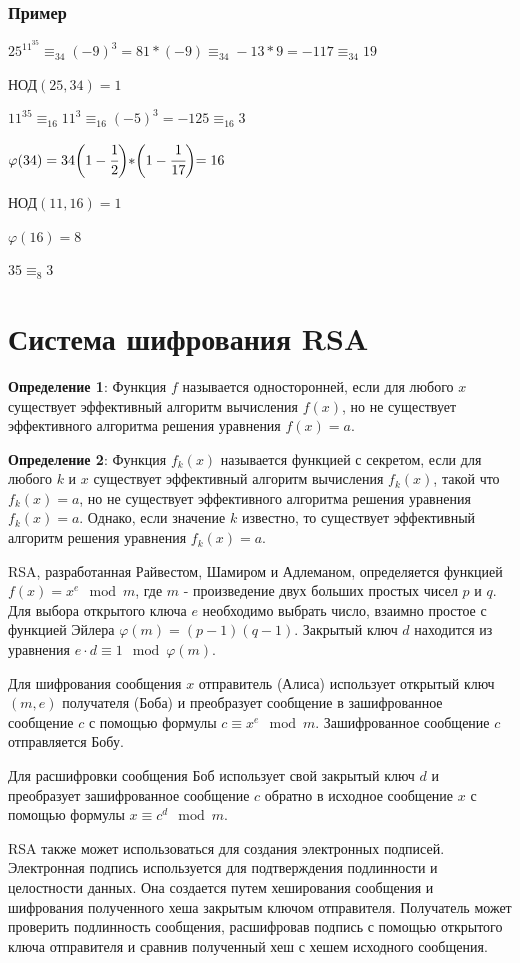 \documentclass[12pt]{article}
\begin{document}
    \subsubsection{Пример}
    $25^{11^{35}}\equiv_{34}(-9)^{3}=81*(-9)\equiv_{34}-13*9=-117\equiv_{34}19$
    \par НОД$(25,34)=1$
    \par $11^{35}\equiv_{16}11^{3}\equiv_{16}(-5)^{3}=-125\equiv_{16}3$
    \par $\varphi(34)=34\biggl(1-\cfrac{1}{2}\biggl)*\biggl(1-\cfrac{1}{17}\biggl)=16$
    \par НОД$(11,16)=1$
    \par $\varphi(16)=8$
    \par $35\equiv_{8}3$

    \section{Система шифрования RSA}

    \textbf{Определение 1}: Функция $f$ называется односторонней, если для любого $x$ существует эффективный алгоритм вычисления $f(x)$, но не существует эффективного алгоритма решения уравнения $f(x) = a$.

    \textbf{Определение 2}: Функция $f_k(x)$ называется функцией с секретом, если для любого $k$ и $x$ существует эффективный алгоритм вычисления $f_k(x)$, такой что $f_k(x) = a$, но не существует эффективного алгоритма решения уравнения $f_k(x) = a$. Однако, если значение $k$ известно, то существует эффективный алгоритм решения уравнения $f_k(x) = a$.

    RSA, разработанная Райвестом, Шамиром и Адлеманом, определяется функцией $f(x) = x^e \mod m$, где $m$ - произведение двух больших простых чисел $p$ и $q$. Для выбора открытого ключа $e$ необходимо выбрать число, взаимно простое с функцией Эйлера $\varphi(m) = (p-1)(q-1)$. Закрытый ключ $d$ находится из уравнения $e \cdot d \equiv 1 \mod \varphi(m)$.

    Для шифрования сообщения $x$ отправитель (Алиса) использует открытый ключ $(m,e)$ получателя (Боба) и преобразует сообщение в зашифрованное сообщение $c$ с помощью формулы $c \equiv x^e \mod m$. Зашифрованное сообщение $c$ отправляется Бобу.

    Для расшифровки сообщения Боб использует свой закрытый ключ $d$ и преобразует зашифрованное сообщение $c$ обратно в исходное сообщение $x$ с помощью формулы $x \equiv c^d \mod m$.

    RSA также может использоваться для создания электронных подписей. Электронная подпись используется для подтверждения подлинности и целостности данных. Она создается путем хеширования сообщения и шифрования полученного хеша закрытым ключом отправителя. Получатель может проверить подлинность сообщения, расшифровав подпись с помощью открытого ключа отправителя и сравнив полученный хеш с хешем исходного сообщения.
\end{document}
